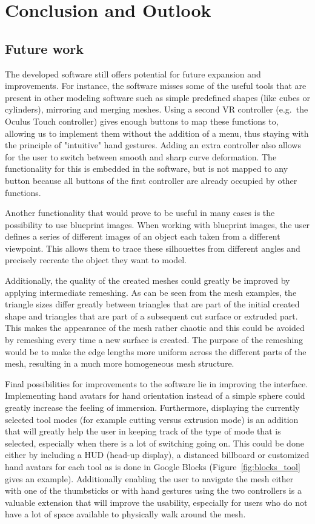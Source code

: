 \chapter{Conclusion and Outlook}
\label{chap:conclusion}

\section{Future work}
The developed software still offers potential for future expansion and improvements. For instance, the software misses some of the useful tools that are present in other modeling software such as simple predefined shapes (like cubes or cylinders), mirroring and merging meshes. Using a second VR controller (e.g.\ the Oculus Touch controller) gives enough buttons to map these functions to, allowing us to implement them without the addition of a menu, thus staying with the principle of "intuitive" hand gestures. Adding an extra controller also allows for the user to switch between smooth and sharp curve deformation. The functionality for this is embedded in the software, but is not mapped to any button because all buttons of the first controller are already occupied by other functions. 

Another functionality that would prove to be useful in many cases is the possibility to use blueprint images. When working with blueprint images, the user defines a series of different images of an object each taken from a different viewpoint. This allows them to trace these silhouettes from different angles and precisely recreate the object they want to model.

Additionally, the quality of the created meshes could greatly be improved by applying intermediate remeshing. As can be seen from the mesh examples, the triangle sizes differ greatly between triangles that are part of the initial created shape and triangles that are part of a subsequent cut surface or extruded part. This makes the appearance of the mesh rather chaotic and this could be avoided by remeshing every time a new surface is created. The purpose of the remeshing would be to make the edge lengths more uniform across the different parts of the mesh, resulting in a much more homogeneous mesh structure.

Final possibilities for improvements to the software lie in improving the interface. Implementing hand avatars for hand orientation instead of a simple sphere could greatly increase the feeling of immersion. Furthermore, displaying the currently selected tool modes (for example cutting versus extrusion mode) is an addition that will greatly help the user in keeping track of the type of mode that is selected, especially when there is a lot of switching going on. This could be done either by including a HUD (head-up display), a distanced billboard or customized hand avatars for each tool as is done in Google Blocks (Figure~\ref{fig:blocks_tool} gives an example). Additionally enabling the user to navigate the mesh either with one of the thumbsticks or with hand gestures using the two controllers is a valuable extension that will improve the usability, especially for users who do not have a lot of space available to physically walk around the mesh. 

